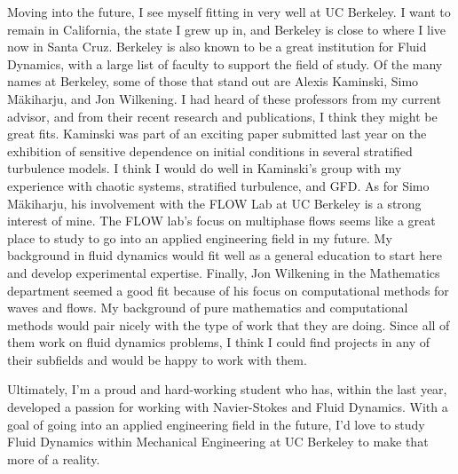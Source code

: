\documentclass{article}
\begin{document}
Moving into the future, I see myself fitting in very well at UC Berkeley. I want to remain in California, the state I grew up in, and Berkeley is close to where I live now in Santa Cruz. Berkeley is also known to be a great institution for Fluid Dynamics, with a large list of faculty to support the field of study. Of the many names at Berkeley, some of those that stand out are Alexis Kaminski, Simo M\"akiharju, and Jon Wilkening. I had heard of these professors from my current advisor, and from their recent research and publications, I think they might be great fits. Kaminski was part of an exciting paper submitted last year on the exhibition of sensitive dependence on initial conditions in several stratified turbulence models. I think I would do well in Kaminski's group with my experience with chaotic systems, stratified turbulence, and GFD. As for Simo M\"akiharju, his involvement with the FLOW Lab at UC Berkeley is a strong interest of mine. The FLOW lab's focus on multiphase flows seems like a great place to study to go into an applied engineering field in my future. My background in fluid dynamics would fit well as a general education to start here and develop experimental expertise. Finally, Jon Wilkening in the Mathematics department seemed a good fit because of his focus on computational methods for waves and flows. My background of pure mathematics and computational methods would pair nicely with the type of work that they are doing. Since all of them work on fluid dynamics problems, I think I could find projects in any of their subfields and would be happy to work with them. 

Ultimately, I'm a proud and hard-working student who has, within the last year, developed a passion for working with Navier-Stokes and Fluid Dynamics. With a goal of going into an applied engineering field in the future, I'd love to study Fluid Dynamics within Mechanical Engineering at UC Berkeley to make that more of a reality. 
\end{document}
